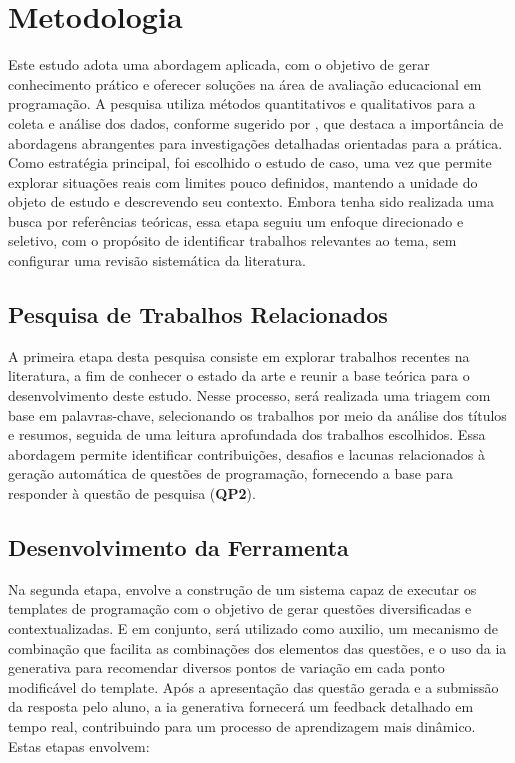 \chapter{Metodologia}\label{cap:metodologia}

Este estudo adota uma abordagem aplicada, com o objetivo de gerar conhecimento prático e oferecer soluções na área de avaliação educacional em programação. A pesquisa utiliza métodos quantitativos e qualitativos para a coleta e análise dos dados, conforme sugerido por \parencite{Gil2017}, que destaca a importância de abordagens abrangentes para investigações detalhadas orientadas para a prática. Como estratégia principal, foi escolhido o estudo de caso, uma vez que permite explorar situações reais com limites pouco definidos, mantendo a unidade do objeto de estudo e descrevendo seu contexto. Embora tenha sido realizada uma busca por referências teóricas, essa etapa seguiu um enfoque direcionado e seletivo, com o propósito de identificar trabalhos relevantes ao tema, sem configurar uma revisão sistemática da literatura. 

\section{Pesquisa de Trabalhos Relacionados}

A primeira etapa desta pesquisa consiste em explorar trabalhos recentes na literatura, a fim de conhecer o estado da arte e reunir a base teórica para o desenvolvimento deste estudo. Nesse processo, será realizada uma triagem com base em palavras-chave, selecionando os trabalhos por meio da análise dos títulos e resumos, seguida de uma leitura aprofundada dos trabalhos escolhidos. Essa abordagem permite identificar contribuições, desafios e lacunas relacionados à geração automática de questões de programação, fornecendo a base para responder à questão de pesquisa (\textbf{QP2}). 


\section{Desenvolvimento da Ferramenta}
Na segunda etapa, envolve a construção de um sistema capaz de executar os templates de programação com o objetivo de gerar questões diversificadas e contextualizadas. E em conjunto, será utilizado como auxilio, um mecanismo de combinação que facilita as combinações dos elementos das questões, e o uso da \gls{ia} generativa para recomendar diversos pontos de variação em cada ponto modificável do template. Após a apresentação das questão gerada e a submissão da resposta pelo aluno, a \gls{ia}  generativa fornecerá um feedback detalhado em tempo real, contribuindo para um processo de aprendizagem mais dinâmico. Estas etapas envolvem: 

